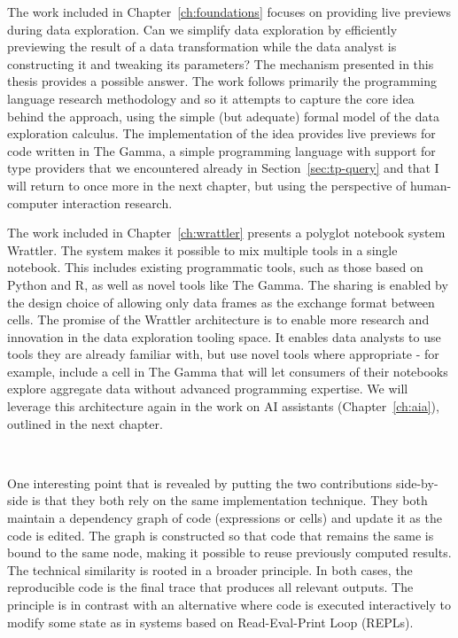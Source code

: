 \documentclass[fleqn,11pt]{report}
\theoremstyle{definition}
\begin{document}
The work included in Chapter~\ref{ch:foundations} focuses on providing live previews during
data exploration. Can we simplify data exploration by efficiently previewing the result of
a data transformation while the data analyst is constructing it and tweaking its parameters?
The mechanism presented in this thesis provides a possible answer. The work follows primarily
the programming language research methodology and so it attempts to capture the core idea
behind the approach, using the simple (but adequate) formal model of the data exploration calculus.
The implementation of the idea provides live previews for code written in The Gamma, a simple
programming language with support for type providers that we encountered already in
Section~\ref{sec:tp-query} and that I will return to once more in the next chapter, but using
the perspective of human-computer interaction research.

The work included in Chapter~\ref{ch:wrattler} presents a polyglot notebook system Wrattler.
The system makes it possible to mix multiple tools in a single notebook. This includes
existing programmatic tools, such as those based on Python and R, as well as novel tools like
The Gamma. The sharing is enabled by the design choice of allowing only data frames as the
exchange format between cells. The promise of the Wrattler architecture is to enable more research
and innovation in the data exploration tooling space. It enables data analysts to use tools they
are already familiar with, but use novel tools where appropriate - for example, include a cell in
The Gamma that will let consumers of their notebooks explore aggregate data without advanced
programming expertise. We will leverage this architecture again in the work on AI assistants
(Chapter~\ref{ch:aia}), outlined in the next chapter.

~

One interesting point that is revealed by putting the two contributions side-by-side is that they
both rely on the same implementation technique. They both maintain a dependency graph of
code (expressions or cells) and update it as the code is edited. The graph is constructed so that
code that remains the same is bound to the same node, making it possible to reuse previously
computed results. The technical similarity is rooted in a broader principle. In both cases,
the reproducible code is the final trace that produces all relevant outputs. The principle is
in contrast with an alternative where code is executed interactively to modify some state
as in systems based on Read-Eval-Print Loop (REPLs).
\end{document}
